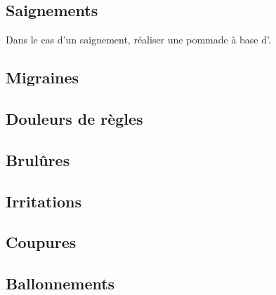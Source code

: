 
\subsection{Saignements}

Dans le cas d'un saignement, réaliser une pommade à base d'. \\

\subsection{Migraines}

\subsection{Douleurs de règles}

\subsection{Brulûres}

\subsection{Irritations}

\subsection{Coupures}

\subsection{Ballonnements}

